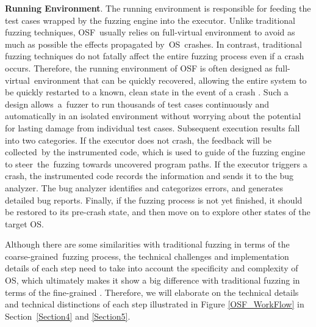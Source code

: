 \textbf{Running Environment}. The running environment is responsible for feeding the test cases wrapped by the fuzzing engine into the executor. Unlike traditional fuzzing techniques, OSF~usually relies on full-virtual environment to avoid as much as possible the effects propagated by~OS~crashes. In contrast, traditional fuzzing techniques do not fatally affect the entire fuzzing process even if a crash occurs. Therefore, the running environment of OSF is often designed as full-virtual~environment that can be quickly recovered, allowing the entire system to be quickly restarted to a known, clean state in the event of a crash \cite{shen2022tardis, lin2022grebe, schumilo2021nyx, pan2021V-shuttle, zhao2022semantic, song2020agamotto}. Such a design allows~a~fuzzer to run thousands of test cases continuously and automatically in an isolated environment without worrying about the potential for lasting damage from individual test cases. Subsequent execution results fall into two categories. If the executor does not crash, the feedback will be collected~by the instrumented code, which is used to guide  of the fuzzing engine to steer~the~fuzzing towards uncovered program paths. If the executor triggers a crash, the instrumented code records the information and sends it to the bug analyzer. The bug analyzer identifies and categorizes errors, and generates detailed bug reports. Finally, if the fuzzing process is not yet finished, it should be restored to its pre-crash state, and then move on to explore other states of the target OS.

Although there are some similarities with traditional fuzzing in terms of the coarse-grained~fuzzing process, the technical challenges and implementation details of each step need to take into account the specificity and complexity of OS, which ultimately makes it show a big difference with traditional fuzzing in terms of the fine-grained . Therefore, we will elaborate on the technical details and technical distinctions of each step illustrated in Figure \ref{OSF_WorkFlow} in Section~\ref{Section4} and \ref{Section5}.

